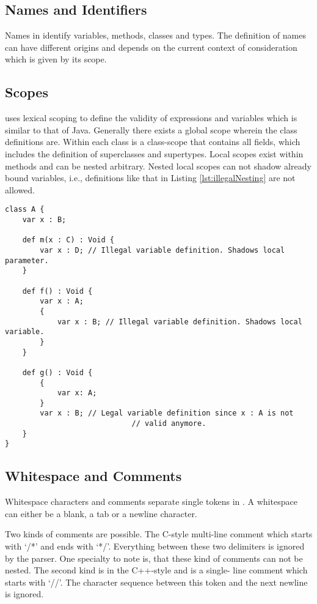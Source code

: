 \subsection{Names and Identifiers}
Names in \ooplss identify variables, methods, classes and types. The
definition of names can have different origins and depends on the current
context of consideration which is given by its scope.


\subsection{Scopes}
\ooplss uses lexical scoping to define the validity of expressions and 
variables which is similar to that of Java. Generally there exists a global
scope wherein the class definitions are. Within each class is a class-scope
that contains all fields, which includes the definition of superclasses and
supertypes. Local scopes exist within methods and can be nested arbitrary.
Nested local scopes can not shadow already bound variables, i.e., definitions
like that in Listing \ref{lst:illegalNesting} are not allowed.

\begin{lstlisting}[float,language=ooplss,caption=Variable definition in local scope,label=lst:illegalNesting]
class A {
	var x : B;

	def m(x : C) : Void {
		var x : D; // Illegal variable definition. Shadows local parameter.
	}

	def f() : Void {
		var x : A; 
		{
			var x : B; // Illegal variable definition. Shadows local variable.
		}
	}

	def g() : Void {
		{
			var x: A;
		}
		var x : B; // Legal variable definition since x : A is not 
							 // valid anymore.
	}
}
\end{lstlisting}
\subsection{Whitespace and Comments}
Whitespace characters and comments separate single tokens in \ooplss. A
whitespace can either be a blank, a tab or a newline character.

Two kinds of comments are possible. The C-style multi-line comment which
starts with `/*' and ends with `*/'. Everything between these two delimiters
is ignored by the parser. One specialty to note is, that these kind of comments
can not be nested. 
The second kind is in the C++-style and is a single- line comment which starts 
with `//'. The character sequence between this token and the next newline
is ignored.


